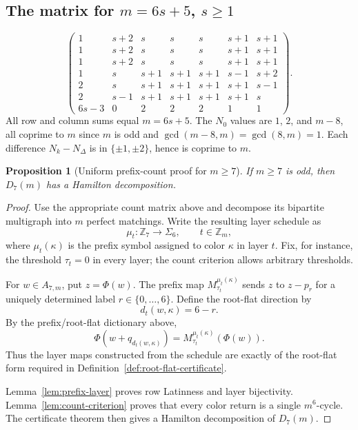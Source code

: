 \documentclass[11pt]{article}
\newtheorem{proposition}{Proposition}
\theoremstyle{definition}
\begin{document}
\subsection{The matrix for \texorpdfstring{\(m=6s+5\), \(s\ge1\)}{m=6s+5, s>=1}}

\[
\begin{pmatrix}
1&s+2&s&s&s&s+1&s+1\\
1&s+2&s&s&s&s+1&s+1\\
1&s+2&s&s&s&s+1&s+1\\
1&s&s+1&s+1&s+1&s-1&s+2\\
2&s&s+1&s+1&s+1&s+1&s-1\\
2&s-1&s+1&s+1&s+1&s+1&s\\
6s-3&0&2&2&2&1&1
\end{pmatrix}.
\]
All row and column sums equal \(m=6s+5\).  The \(N_0\) values are \(1\), \(2\), and \(m-8\), all coprime to \(m\) since \(m\) is odd and \(\gcd(m-8,m)=\gcd(8,m)=1\).  Each difference \(N_k-N_\Delta\) is in \(\{\pm1,\pm2\}\), hence is coprime to \(m\).


\begin{proposition}[Uniform prefix-count proof for \(m\ge7\)]\label{prop:mge7}
If \(m\ge7\) is odd, then \(D_7(m)\) has a Hamilton decomposition.
\end{proposition}

\begin{proof}
Use the appropriate count matrix above and decompose its bipartite multigraph into \(m\) perfect matchings.  Write the resulting layer schedule as
\[
\mu_t:\mathbb Z_7\to\Sigma_6,
\qquad t\in\mathbb Z_m,
\]
where \(\mu_t(\kappa)\) is the prefix symbol assigned to color \(\kappa\) in layer \(t\).  Fix, for instance, the threshold \(\tau_t=0\) in every layer; the count criterion allows arbitrary thresholds.

For \(w\in A_{7,m}\), put \(z=\Phi(w)\).  The prefix map \(M_{\tau_t}^{\mu_t(\kappa)}\) sends \(z\) to \(z-p_r\) for a uniquely determined label \(r\in\{0,\ldots,6\}\).  Define the root-flat direction by
\[
d_t(w,\kappa)=6-r.
\]
By the prefix/root-flat dictionary above,
\[
\Phi(w+q_{d_t(w,\kappa)})=M_{\tau_t}^{\mu_t(\kappa)}(\Phi(w)).
\]
Thus the layer maps constructed from the schedule are exactly of the root-flat form required in Definition~\ref{def:root-flat-certificate}.

Lemma~\ref{lem:prefix-layer} proves row Latinness and layer bijectivity.  Lemma~\ref{lem:count-criterion} proves that every color return is a single \(m^6\)-cycle.  The certificate theorem then gives a Hamilton decomposition of \(D_7(m)\).
\end{proof}
\end{document}
